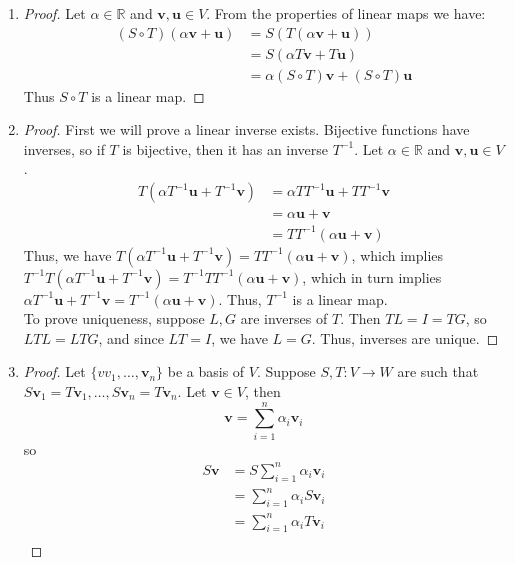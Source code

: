 \documentclass[12pt]{article}
\theoremstyle{plain}
\newcommand{\R}{\mathbb{R}}
\newcommand{\vv}{\mathbf{v}}
\newcommand{\vu}{\mathbf{u}}
\begin{document}
    \begin{enumerate}
        \item 
        \begin{proof}
            Let $\alpha \in \R$ and $\vv, \vu \in V$. From the properties of linear maps we have:
            \begin{align}
                (S \circ T)(\alpha \vv + \vu) &= S(T(\alpha \vv + \vu))\\
                &= S(\alpha T \vv + T \vu)\\
                &= \alpha (S \circ T) \vv + (S \circ T) \vu
            \end{align}
            Thus $S \circ T$ is a linear map.
        \end{proof}
        \item \begin{proof}
            First we will prove a linear inverse exists. Bijective functions have inverses, so if $T$ is bijective, then it has an inverse $T^{-1}$. Let $\alpha \in \R$ and $\vv, \vu \in V$. 
            \begin{align}
                T(\alpha T^{-1} \vu + T^{-1} \vv) &= \alpha TT^{-1} \vu + TT^{-1} \vv \\
                &= \alpha \vu + \vv\\
                &= TT^{-1}(\alpha \vu + \vv)
            \end{align}
            Thus, we have $ T(\alpha T^{-1} \vu + T^{-1} \vv) = TT^{-1}(\alpha \vu + \vv)$, which implies $T^{-1}T(\alpha T^{-1} \vu + T^{-1} \vv) = T^{-1}TT^{-1}(\alpha \vu + \vv)$, which in turn implies $\alpha T^{-1} \vu + T^{-1} \vv = T^{-1}(\alpha \vu + \vv)$. Thus, $T^{-1}$ is a linear map. \\
            To prove uniqueness, suppose $L, G$ are inverses of $T$. Then $TL = I = TG$, so $LTL = LTG$, and since $LT = I$, we have $L = G$. Thus, inverses are unique.
        \end{proof}
        \item \begin{proof}
            Let $\{vv_1, \dots, \vv_n\}$ be a basis of $V$. Suppose $S, T: V \to W$ are such that $S\vv_1 = T\vv_1, \dots, S\vv_n = T\vv_n$. Let $\vv \in V$, then $$\vv = \sum_{i = 1}^n \alpha_i \vv_i$$so 
            \begin{align*}
                S\vv &= S\sum_{i = 1}^n \alpha_i \vv_i \\
                &= \sum_{i = 1}^n \alpha_i S \vv_i \\
                &= \sum_{i = 1}^n \alpha_i T \vv_i \\

\end{align*}
\end{proof}
\end{enumerate}
\end{document}
